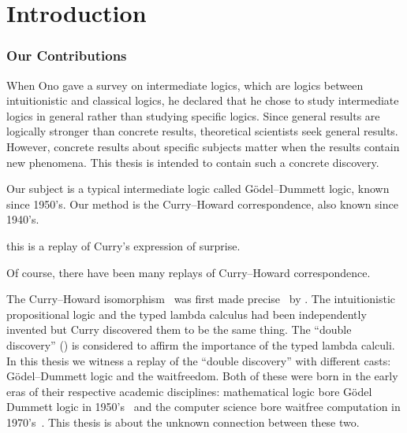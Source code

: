 \chapter{Introduction}

\subsection{Our Contributions}

When Ono gave a survey on intermediate logics, which are logics between
intuitionistic and classical logics,
he  declared that he chose to study intermediate logics in
general rather than studying specific logics.
Since general results are logically stronger than concrete results,
theoretical scientists seek general results.
However, concrete results about specific subjects matter when the results
contain new phenomena.
This thesis is intended to contain such a concrete discovery.

Our subject is a typical intermediate logic called G\"odel--Dummett
logic, known since 1950's.
Our method is the Curry--Howard correspondence, also known since 1940's.


this is a replay of Curry's expression of surprise.

Of course, there have been many replays of Curry--Howard correspondence.


The Curry--Howard isomorphism~\citep{curryhoward} was first made
precise~\citep[p.97]{curryhoward} by \citet[\textbf{9}E and
\textbf{9}F]{curry1974combinatory}.
The intuitionistic propositional logic and the typed lambda calculus
had been independently invented but Curry discovered them to be the same thing.
The ``double discovery'' (\citet{wadler2012propositions}) is considered
to affirm the importance of the typed lambda calculi.
In this thesis we witness a replay of the ``double discovery'' with
different casts: G\"odel--Dummett logic and the waitfreedom.
Both of these were born in the early eras of their respective academic
disciplines:
mathematical logic bore G\"odel Dummett logic in
1950's~\citep{dummett59}
and the
computer science bore waitfree computation in
1970's~\citep{lamport1979make}.
This thesis is about the unknown connection between these two.

